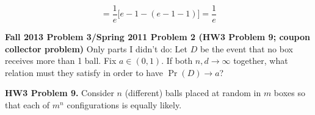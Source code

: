 \[
= \frac{1}{e} \big[e - 1 - (e - 1 - 1) \big]  = \boxed{\frac{1}{e}}
\]


%
%
%
%

\textbf{Fall 2013 Problem 3/Spring 2011 Problem 2 (HW3 Problem 9; coupon collector problem)} Only parts I didn't do:  Let \(D\) be the event that no box receives more than 1 ball. Fix \(a \in (0,1)\). If both \(n, d \to \infty\) together, what relation must they satisfy in order to have \(\Pr(D) \to a\)?

\textbf{HW3 Problem 9.} Consider \(n\) (different) balls placed at random in \(m\) boxes so that each of \(m^n\) configurations is equally likely.

